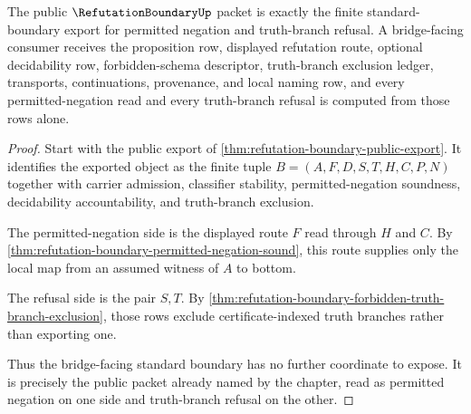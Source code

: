 \begin{theorem}
\label{thm:refutation-boundary-standard-boundary-export}
The public $\RefutationBoundaryUp$ packet is exactly the finite standard-boundary export for permitted negation and truth-branch refusal. A bridge-facing consumer receives the proposition row, displayed refutation route, optional decidability row, forbidden-schema descriptor, truth-branch exclusion ledger, transports, continuations, provenance, and local naming row, and every permitted-negation read and every truth-branch refusal is computed from those rows alone.
\end{theorem}
\begin{proof}
Start with the public export of \autoref{thm:refutation-boundary-public-export}. It identifies the exported object as the finite tuple $B=(A,F,D,S,T,H,C,P,N)$ together with carrier admission, classifier stability, permitted-negation soundness, decidability accountability, and truth-branch exclusion.

The permitted-negation side is the displayed route $F$ read through $H$ and $C$. By \autoref{thm:refutation-boundary-permitted-negation-sound}, this route supplies only the local map from an assumed witness of $A$ to bottom.

The refusal side is the pair $S,T$. By \autoref{thm:refutation-boundary-forbidden-truth-branch-exclusion}, those rows exclude certificate-indexed truth branches rather than exporting one.

Thus the bridge-facing standard boundary has no further coordinate to expose. It is precisely the public packet already named by the chapter, read as permitted negation on one side and truth-branch refusal on the other.
\end{proof}

